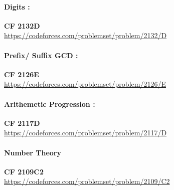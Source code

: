\documentclass[11pt]{article}
\begin{document}
\paragraph{Digits :}
\textbf{CF 2132D} \\
\url{https://codeforces.com/problemset/problem/2132/D}

\paragraph{Prefix/ Suffix GCD :}
\textbf{CF 2126E} \\
\url{https://codeforces.com/problemset/problem/2126/E}

\paragraph{Arithemetic Progression :}
\textbf{CF 2117D} \\
\url{https://codeforces.com/problemset/problem/2117/D}

\paragraph{Number Theory}
\textbf{CF 2109C2} \\
\url{https://codeforces.com/problemset/problem/2109/C2}
\end{document}
